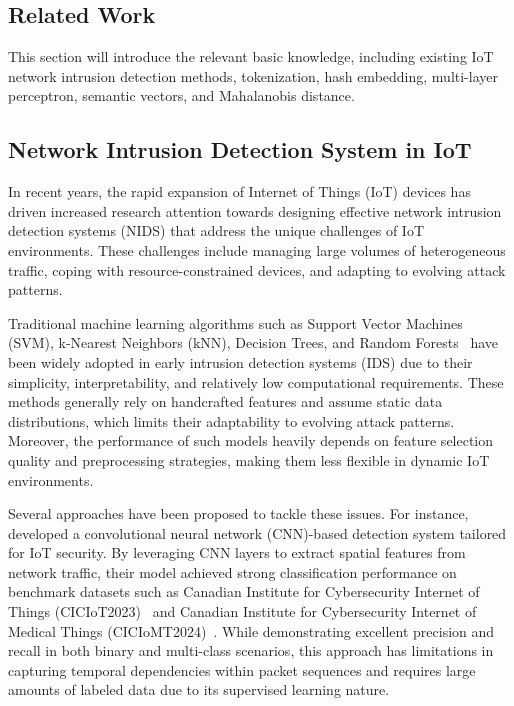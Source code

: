 \begin{ZhChapter}
    \chapter{Related Work}
    This section will introduce the relevant basic knowledge, including existing IoT network intrusion detection methods, tokenization, hash embedding, multi-layer perceptron, semantic vectors, and Mahalanobis distance.


    \section{Network Intrusion Detection System in IoT}
    In recent years, the rapid expansion of Internet of Things (IoT) devices has driven increased research attention towards designing effective network intrusion detection systems (NIDS) that address the unique challenges of IoT environments. These challenges include managing large volumes of heterogeneous traffic, coping with resource-constrained devices, and adapting to evolving attack patterns.

    Traditional machine learning algorithms such as Support Vector Machines (SVM), k-Nearest Neighbors (kNN), Decision Trees, and Random Forests~\cite{huang2025machine} have been widely adopted in early intrusion detection systems (IDS) due to their simplicity, interpretability, and relatively low computational requirements. These methods generally rely on handcrafted features and assume static data distributions, which limits their adaptability to evolving attack patterns. Moreover, the performance of such models heavily depends on feature selection quality and preprocessing strategies, making them less flexible in dynamic IoT environments.

    Several approaches have been proposed to tackle these issues. For instance, \citeauthor{kharoubi2025network} \cite{kharoubi2025network} developed a convolutional neural network (CNN)-based detection system tailored for IoT security. By leveraging CNN layers to extract spatial features from network traffic, their model achieved strong classification performance on benchmark datasets such as Canadian Institute for Cybersecurity Internet of Things (CICIoT2023)~\cite{ciciot2023} and Canadian Institute for Cybersecurity Internet of Medical Things (CICIoMT2024)~\cite{ciciot2024}. While demonstrating excellent precision and recall in both binary and multi-class scenarios, this approach has limitations in capturing temporal dependencies within packet sequences and requires large amounts of labeled data due to its supervised learning nature.


\end{ZhChapter}

